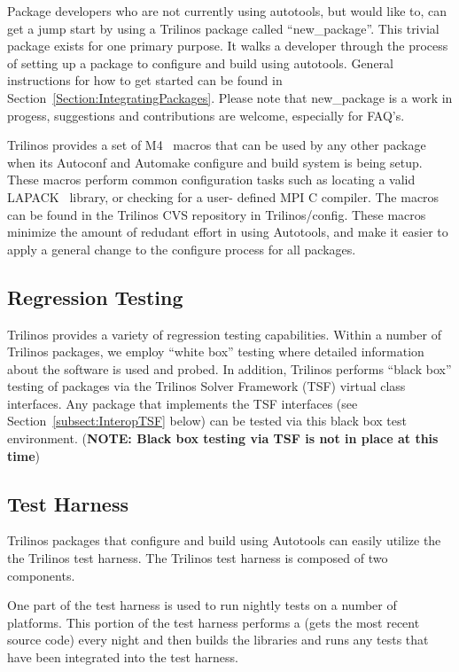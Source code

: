 \documentclass[12pt,relax]{TrilinosDevGuide}
\begin{document}
Package developers who are not currently using autotools, but would like
to, can get a jump start by using a Trilinos package called 
``new\_package''.  This trivial package exists for one primary purpose.  
It walks a developer through the process of setting up a package to 
configure and build using autotools.  General instructions for how to get 
started can be found in Section~\ref{Section:IntegratingPackages}.  Please 
note that new\_package is a work in progess, suggestions and contributions are 
welcome, especially for FAQ's.

Trilinos provides a set of M4~\cite{M4} macros that can be used by any other
package when its Autoconf and Automake configure and build system is being 
setup.  These macros perform common configuration tasks such as
locating a valid LAPACK~\cite{lapack} library, or checking for a user-
defined MPI C compiler.  The macros can be found in the Trilinos CVS 
repository in Trilinos/config.  These macros minimize the amount of redudant
 effort in using Autotools, and make it easier to apply a general change to 
the configure process for all packages.
\subsection{Regression Testing}
Trilinos provides a variety of regression
testing capabilities.  Within a number of Trilinos packages, we employ
``white box'' testing where detailed information about the software is
used and probed.  In addition, Trilinos performs ``black box'' testing
of packages via the Trilinos Solver Framework (TSF) virtual class
interfaces.  Any package that implements the TSF interfaces (see
Section~\ref{subsect:InteropTSF} below) can be tested via this black box
test environment.  ({\bf NOTE: Black box testing via TSF is not in
place at this time})

\subsection{Test Harness}
\label{subsect:TestHarness}

Trilinos packages that configure and build using Autotools can easily 
utilize the the Trilinos test harness.  The Trilinos test harness is composed 
of two components.  

One part of the test harness is used to run nightly tests on a number of 
platforms.  This portion of the test harness performs a 
 (gets the most recent source code) every night and 
then builds the libraries and runs any tests that have been integrated into 
the test harness.  
\end{document}
